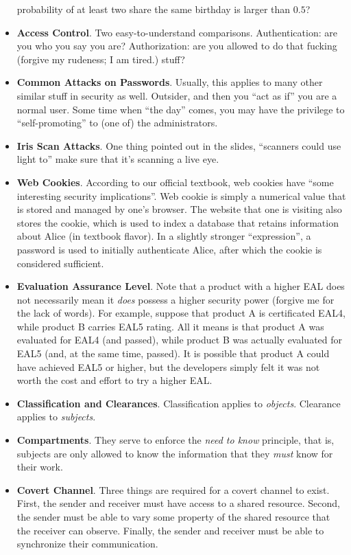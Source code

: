 \documentclass[twocolumn]{article}
\begin{document}
\begin{itemize}
  probability of at least two share the same birthday is larger than
  $0.5$?  
\item \textbf{Access Control}. Two easy-to-understand
  comparisons. Authentication: are you who you say you are?
  Authorization: are you allowed to do that fucking (forgive my
  rudeness; I am tired.) stuff?
\item \textbf{Common Attacks on Passwords}. Usually, this applies to
  many other similar stuff in security as well. Outsider, and then you
  ``act as if'' you are a normal user. Some time when ``the day''
  comes, you may have the privilege to ``self-promoting'' to (one of)
  the administrators.
\item \textbf{Iris Scan Attacks}. One thing pointed out in the slides,
  ``scanners could use light to'' make sure that it's scanning a live
  eye. 
\item \textbf{Web Cookies}. According to our official textbook, web
  cookies have ``some interesting security implications''. Web cookie
  is simply a numerical value that is stored and managed by one's
  browser. The website that one is visiting also stores the cookie,
  which is used to index a database that retains information about
  Alice (in textbook flavor). In a slightly stronger ``expression'', a
  password is used to initially authenticate Alice, after which the
  cookie is considered sufficient.
\item \textbf{Evaluation Assurance Level}. Note that a product with a
  higher EAL does not necessarily mean it \emph{does} possess a higher
  security power (forgive me for the lack of words). For example,
  suppose that product A is certificated EAL4, while product B carries
  EAL5 rating. All it means is that product A was evaluated for EAL4
  (and passed), while product B was actually evaluated for EAL5 (and,
  at the same time, passed). It is possible that product A could have
  achieved EAL5 or higher, but the developers simply felt it was not
  worth the cost and effort to try a higher EAL.\@
\item \textbf{Classification and Clearances}. Classification applies
  to \emph{objects}. Clearance applies to \emph{subjects}. 
\item \textbf{Compartments}. They serve to enforce the \emph{need to
    know} principle, that is, subjects are only allowed to know the
  information that they \emph{must} know for their work.
\item \textbf{Covert Channel}. Three things are required for a covert
  channel to exist. First, the sender and receiver must have access to
  a shared resource. Second, the sender must be able to vary some
  property of the shared resource that the receiver can
  observe. Finally, the sender and receiver must be able to
  synchronize their communication. 
\end{itemize}
\end{document}
